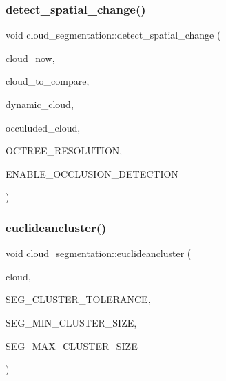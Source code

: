 \mbox{\label{classdatmo_1_1cloud__segmentation_a6dcd90f46e590756a42aafd290443fcf}} 
\subsubsection{\texorpdfstring{detect\+\_\+spatial\+\_\+change()}{detect\_spatial\_change()}}
{\footnotesize\ttfamily void cloud\+\_\+segmentation\+::detect\+\_\+spatial\+\_\+change (\begin{DoxyParamCaption}\item[{const pcl\+::\+Point\+Cloud$<$ pcl\+::\+Point\+X\+YZ $>$\+::Ptr \&}]{cloud\+\_\+now,  }\item[{const pcl\+::\+Point\+Cloud$<$ pcl\+::\+Point\+X\+YZ $>$\+::Ptr \&}]{cloud\+\_\+to\+\_\+compare,  }\item[{const pcl\+::\+Point\+Cloud$<$ pcl\+::\+Point\+X\+YZ $>$\+::Ptr \&}]{dynamic\+\_\+cloud,  }\item[{const pcl\+::\+Point\+Cloud$<$ pcl\+::\+Point\+X\+Y\+Z\+R\+GB $>$\+::Ptr \&}]{occuluded\+\_\+cloud,  }\item[{float}]{O\+C\+T\+R\+E\+E\+\_\+\+R\+E\+S\+O\+L\+U\+T\+I\+ON,  }\item[{bool}]{E\+N\+A\+B\+L\+E\+\_\+\+O\+C\+C\+L\+U\+S\+I\+O\+N\+\_\+\+D\+E\+T\+E\+C\+T\+I\+ON }\end{DoxyParamCaption})\hspace{0.3cm}{\ttfamily [private]}}

\mbox{\label{classdatmo_1_1cloud__segmentation_a7506a589048c71ab56a49d6470591ef1}} 
\subsubsection{\texorpdfstring{euclideancluster()}{euclideancluster()}}
{\footnotesize\ttfamily void cloud\+\_\+segmentation\+::euclideancluster (\begin{DoxyParamCaption}\item[{const pcl\+::\+Point\+Cloud$<$ pcl\+::\+Point\+X\+YZ $>$\+::Ptr \&}]{cloud,  }\item[{float}]{S\+E\+G\+\_\+\+C\+L\+U\+S\+T\+E\+R\+\_\+\+T\+O\+L\+E\+R\+A\+N\+CE,  }\item[{int}]{S\+E\+G\+\_\+\+M\+I\+N\+\_\+\+C\+L\+U\+S\+T\+E\+R\+\_\+\+S\+I\+ZE,  }\item[{int}]{S\+E\+G\+\_\+\+M\+A\+X\+\_\+\+C\+L\+U\+S\+T\+E\+R\+\_\+\+S\+I\+ZE }\end{DoxyParamCaption})\hspace{0.3cm}{\ttfamily [private]}}

